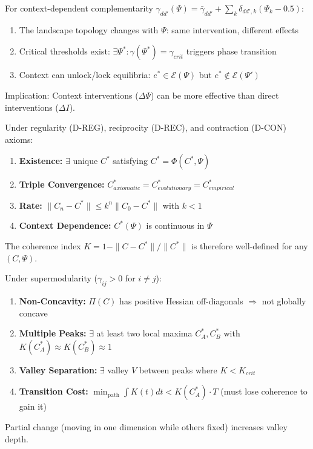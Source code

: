 \begin{theorem}
For context-dependent complementarity $\gamma_{dd'}(\Psi) = \bar{\gamma}_{dd'} + \sum_k \delta_{dd',k}(\Psi_k - 0.5)$:
\begin{enumerate}
\item The landscape topology changes with $\Psi$: same intervention, different effects
\item Critical thresholds exist: $\exists \Psi^* : \gamma(\Psi^*) = \gamma_{crit}$ triggers phase transition
\item Context can unlock/lock equilibria: $e^* \in \mathcal{E}(\Psi)$ but $e^* \notin \mathcal{E}(\Psi')$
\end{enumerate}
Implication: Context interventions ($\Delta\Psi$) can be more effective than direct interventions ($\Delta I$).
\end{theorem}

\begin{theorem}
Under regularity (D-REG), reciprocity (D-REC), and contraction (D-CON) axioms:
\begin{enumerate}
\item \textbf{Existence:} $\exists$ unique $C^*$ satisfying $C^* = \Phi(C^*, \Psi)$
\item \textbf{Triple Convergence:} $C^*_{axiomatic} = C^*_{evolutionary} = C^*_{empirical}$
\item \textbf{Rate:} $\|C_n - C^*\| \leq k^n\|C_0 - C^*\|$ with $k < 1$
\item \textbf{Context Dependence:} $C^*(\Psi)$ is continuous in $\Psi$
\end{enumerate}
The coherence index $K = 1 - \|C - C^*\|/\|C^*\|$ is therefore well-defined for any $(C, \Psi)$.
\end{theorem}

\begin{theorem}
Under supermodularity ($\gamma_{ij} > 0$ for $i \neq j$):
\begin{enumerate}
\item \textbf{Non-Concavity:} $\Pi(C)$ has positive Hessian off-diagonals $\Rightarrow$ not globally concave
\item \textbf{Multiple Peaks:} $\exists$ at least two local maxima $C^*_A, C^*_B$ with $K(C^*_A) \approx K(C^*_B) \approx 1$
\item \textbf{Valley Separation:} $\exists$ valley $V$ between peaks where $K < K_{crit}$
\item \textbf{Transition Cost:} $\min_{\text{path}} \int K(t) dt < K(C^*_A) \cdot T$ (must lose coherence to gain it)
\end{enumerate}
Partial change (moving in one dimension while others fixed) increases valley depth.
\end{theorem}

